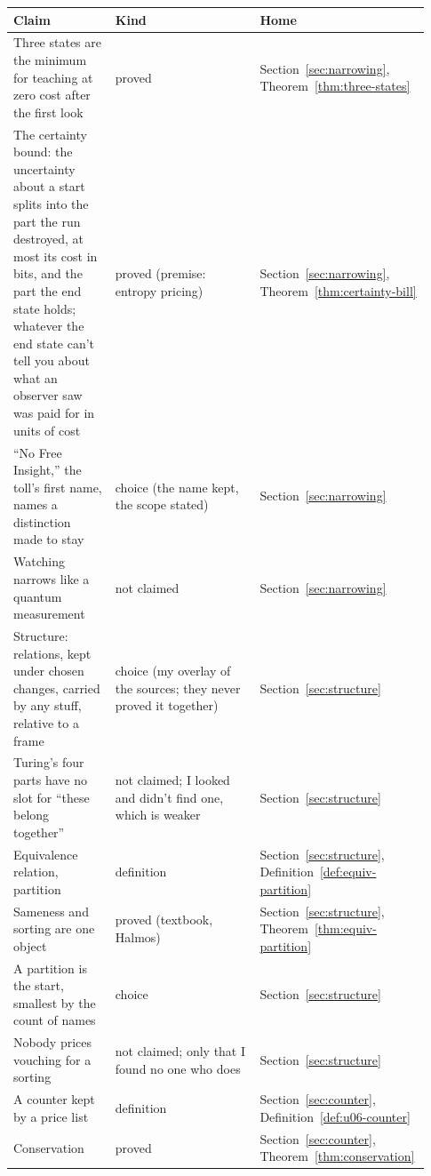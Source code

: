 \documentclass[11pt,twoside]{article}
\theoremstyle{thielethm}
\theoremstyle{thieledef}
\theoremstyle{thieledef}
\theoremstyle{thieledef}
\theoremstyle{thielethm}
\theoremstyle{thieleobs}
\theoremstyle{thielethm}
\begin{document}
\begingroup\small
\begin{longtable}{@{}>{\raggedright\arraybackslash}p{0.242\linewidth}>{\raggedright\arraybackslash}p{0.344\linewidth}>{\raggedright\arraybackslash}p{0.344\linewidth}@{}}
\toprule
\textbf{Claim} & \textbf{Kind} & \textbf{Home} \\
\midrule
\endhead
\bottomrule
\endlastfoot
Three states are the minimum for teaching at zero cost after the first look & proved & Section~\ref{sec:narrowing}, Theorem~\ref{thm:three-states} \\
The certainty bound: the uncertainty about a start splits into the part the run destroyed, at most its cost in bits, and the part the end state holds; whatever the end state can't tell you about what an observer saw was paid for in units of cost & proved (premise: entropy pricing) & Section~\ref{sec:narrowing}, Theorem~\ref{thm:certainty-bill} \\
``No Free Insight,'' the toll's first name, names a distinction made to stay & choice (the name kept, the scope stated) & Section~\ref{sec:narrowing} \\
Watching narrows like a quantum measurement & not claimed & Section~\ref{sec:narrowing} \\
Structure: relations, kept under chosen changes, carried by any stuff, relative to a frame & choice (my overlay of the sources; they never proved it together) & Section~\ref{sec:structure} \\
Turing's four parts have no slot for ``these belong together'' & not claimed; I looked and didn't find one, which is weaker & Section~\ref{sec:structure} \\
Equivalence relation, partition & definition & Section~\ref{sec:structure}, Definition~\ref{def:equiv-partition} \\
Sameness and sorting are one object & proved (textbook, Halmos) & Section~\ref{sec:structure}, Theorem~\ref{thm:equiv-partition} \\
A partition is the start, smallest by the count of names & choice & Section~\ref{sec:structure} \\
Nobody prices vouching for a sorting & not claimed; only that I found no one who does & Section~\ref{sec:structure} \\
A counter kept by a price list & definition & Section~\ref{sec:counter}, Definition~\ref{def:u06-counter} \\
Conservation & proved  & Section~\ref{sec:counter}, Theorem~\ref{thm:conservation} \\

\end{longtable}
\end{document}
